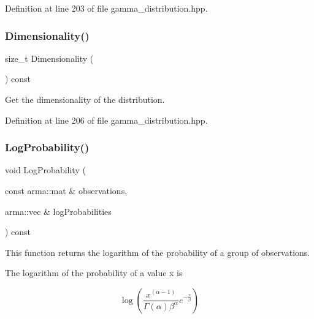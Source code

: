 Definition at line 203 of file gamma\+\_\+distribution.\+hpp.

\mbox{\label{classmlpack_1_1distribution_1_1GammaDistribution_a78eda6bfb9e9462afa0fc85e32abe1af}} 
\subsubsection{Dimensionality()}
{\footnotesize\ttfamily size\+\_\+t Dimensionality (\begin{DoxyParamCaption}{ }\end{DoxyParamCaption}) const\hspace{0.3cm}{\ttfamily [inline]}}



Get the dimensionality of the distribution. 



Definition at line 206 of file gamma\+\_\+distribution.\+hpp.

\mbox{\label{classmlpack_1_1distribution_1_1GammaDistribution_a10aa8675001ec75323be892d23b4a2cb}} 
\subsubsection{Log\+Probability()\hspace{0.1cm}{\footnotesize\ttfamily [1/2]}}
{\footnotesize\ttfamily void Log\+Probability (\begin{DoxyParamCaption}\item[{const arma\+::mat \&}]{observations,  }\item[{arma\+::vec \&}]{log\+Probabilities }\end{DoxyParamCaption}) const}



This function returns the logarithm of the probability of a group of observations. 

The logarithm of the probability of a value x is

\[ \log(\frac{x^{(\alpha - 1)}}{\Gamma(\alpha) \beta^\alpha} e^ {-\frac{x}{\beta}}) \]

